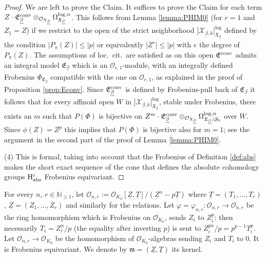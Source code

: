 \documentclass[asterisque,english]{smfart}
\begin{document}
\begin{proof}
 We are left to prove the Claim. It suffices to prove the Claim for each term $Z \cdot \mathfrak{E}^{\rm conv}_{\underline{\beta}} \otimes_{\mathcal{O}_{\mathfrak{X}_{\underline{\beta}}}} \Omega^{\log,n}_{\mathfrak{X}_{\underline{\beta}}} $. This follows from Lemma \ref{lemma:PHIM0} (for $r=1$ and $Z_1=Z$) if we restrict to the open of the strict neighborhood  $]\mathcal{X}_{\underline{\beta},k}[^{\log}_{\mathfrak{X}_{\underline{\beta}}}$ defined by the condition $\vert P_\pi(Z)\vert \leq \vert p \vert$ or equivalently $\vert Z^e\vert \leq \vert p \vert$ with $e$ the degree of $P_\pi(Z)$. 
The assumptions of loc.~cit.~are satisfied as  on this open $\mathfrak{E}^{\rm conv}$ admits an integral model $\mathfrak{E}_{\underline{\beta}}$ which is an $\mathcal{O}_{e,1}$-module, with an integrally defined  Frobenius $\Phi_{\mathfrak{E}_{\underline{\beta}}}$ compatible with the one on  $\mathcal{O}_{e,1}$, as explained in the proof of Proposition \ref{prop:Econv}. Since $\mathfrak{E}^{\rm conv}_{\underline{\beta}}$ is defined by Frobenius-pull back of $\mathfrak{E}_{\underline{\beta}}$ it follows that for every affinoid open $W$ in $]\mathcal{X}_{\underline{\beta},k}[^{\log}_{\mathfrak{X}_{\underline{\beta}}}$, stable under Frobenius,  there exists an $m$  such that  $P(\Phi)$  is bijective on $Z^m \cdot \mathfrak{E}^{\rm conv}_{\underline{\beta}} \otimes_{\mathcal{O}_{\mathfrak{X}_{\underline{\beta}}}} \Omega^{\log,n}_{\mathfrak{X}_{\underline{\beta}}/\mathcal{S}_0} $ over $W$. Since $\phi(Z)=Z^p$ this implies that  $P(\Phi)$  is bijective also for $m=1$; see the argument in the second part of the proof of Lemma \ref{lemma:PHIM0}. 

(4) This is formal, taking into account that the Frobenius of Definition \ref{def:abs} makes the short exact sequence of the cone that defines the absolute cohomology groups  ${\rm H}^i_{\rm abs}$ Frobenius equivariant.
\end{proof}


For every $n$, $r\in \mathbb{N}_{\geq 1}$, let $\mathcal{O}_{n,r}:=\mathcal{O}_{K_0}\left[ \underline{Z},\underline{T}\right] /\left( \underline{Z}^{n}-p
\underline{T}\right) $ where $\underline{T}=\left( T_{1},\ldots,T_{r}\right) $, 
$\underline{Z}=\left( Z_{1},\ldots,Z_{r}\right) $ and similarly for the
relations. Let $\varphi =\varphi _{n,r}:\mathcal{O}_{n,r}\rightarrow 
\mathcal{O}_{n,r}$ be the ring homomorphism which is Frobenius on $\mathcal{O
}_{K_0}$, sends $Z_{i}$ to $Z_{i}^{p}$: then necessarily $T_{i}=
Z_{i}^{n}/p$ (the equality after inverting $p$) is sent to $
Z_{i}^{pn}/p=p^{p-1}T_{i}^{p}$. Let $\mathcal{O}_{n,r}\rightarrow \mathcal{
O}_{K_0}$ be the homomorphism of $\mathcal{O}_{K_0}$-algebras sending $
Z_{i}$ and $T_{i}$ to $0$. It is Frobenius equivariant. We denote by $
\mathfrak{m}=\left( \underline{Z},\underline{T}\right) $ its kernel.
\end{document}
